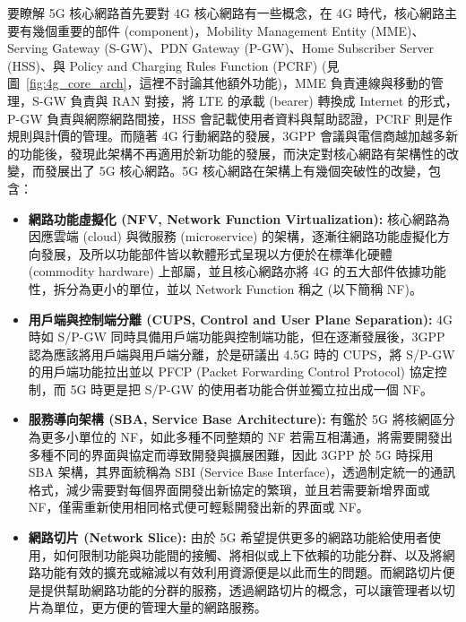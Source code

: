 要瞭解 5G 核心網路首先要對 4G 核心網路有一些概念，在 4G 時代，核心網路主要有幾個重要的部件 (component)，Mobility Management Entity (MME)、Serving Gateway (S-GW)、PDN Gateway (P-GW)、Home Subscriber Server (HSS)、與 Policy and Charging Rules Function (PCRF) (見圖~\ref{fig:4g_core_arch}，這裡不討論其他額外功能)，MME 負責連線與移動的管理，S-GW 負責與 RAN 對接，將 LTE 的承載 (bearer) 轉換成 Internet 的形式，P-GW 負責與網際網路間接，HSS 會記載使用者資料與幫助認證，PCRF 則是作規則與計價的管理。而隨著 4G 行動網路的發展，3GPP 會議與電信商越加越多新的功能後，發現此架構不再適用於新功能的發展，而決定對核心網路有架構性的改變，而發展出了 5G 核心網路。5G 核心網路在架構上有幾個突破性的改變，包含：
\begin{itemize}
\item \textbf{網路功能虛擬化 (NFV, Network Function Virtualization):} 核心網路為因應雲端 (cloud) 與微服務 (microservice) 的架構，逐漸往網路功能虛擬化方向發展，及所以功能部件皆以軟體形式呈現以方便於在標準化硬體 (commodity hardware) 上部屬，並且核心網路亦將 4G 的五大部件依據功能性，拆分為更小的單位，並以 Network Function 稱之 (以下簡稱 NF)。
\item \textbf{用戶端與控制端分離 (CUPS, Control and User Plane Separation):} 4G 時如 S/P-GW 同時具備用戶端功能與控制端功能，但在逐漸發展後，3GPP 認為應該將用戶端與用戶端分離，於是研議出 4.5G 時的 CUPS，將 S/P-GW 的用戶端功能拉出並以 PFCP (Packet Forwarding Control Protocol) 協定控制，而 5G 時更是把 S/P-GW 的使用者功能合併並獨立拉出成一個 NF。
\item \textbf{服務導向架構 (SBA, Service Base Architecture):} 有鑑於 5G 將核網區分為更多小單位的 NF，如此多種不同整類的 NF 若需互相溝通，將需要開發出多種不同的界面與協定而導致開發與擴展困難，因此 3GPP 於 5G 時採用 SBA 架構，其界面統稱為 SBI (Service Base Interface)，透過制定統一的通訊格式，減少需要對每個界面開發出新協定的繁瑣，並且若需要新增界面或 NF，僅需重新使用相同格式便可輕鬆開發出新的界面或 NF。
\item \textbf{網路切片 (Network Slice):} 由於 5G 希望提供更多的網路功能給使用者使用，如何限制功能與功能間的接觸、將相似或上下依賴的功能分群、以及將網路功能有效的擴充或縮減以有效利用資源便是以此而生的問題。而網路切片便是提供幫助網路功能的分群的服務，透過網路切片的概念，可以讓管理者以切片為單位，更方便的管理大量的網路服務。
\end{itemize}

